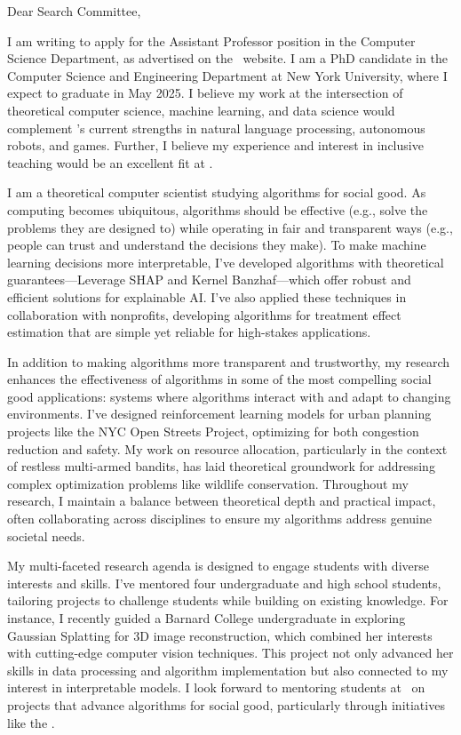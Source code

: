 \documentclass[11pt]{article}
\begin{document}
{\setlength{\parindent}{0cm}

Dear Search Committee,

I am writing to apply for the Assistant Professor position in the Computer Science Department, as advertised on the \school~website. I am a PhD candidate in the Computer Science and Engineering Department at New York University, where I expect to graduate in May 2025. I believe my work at the intersection of theoretical computer science, machine learning, and data science would complement \school’s current strengths in natural language processing, autonomous robots, and games. Further, I believe my experience and interest in inclusive teaching would be an excellent fit at \school.

I am a theoretical computer scientist studying algorithms for social good. As computing becomes ubiquitous, algorithms should be effective (e.g., solve the problems they are designed to) while operating in fair and transparent ways (e.g., people can trust and understand the decisions they make). To make machine learning decisions more interpretable, I’ve developed algorithms with theoretical guarantees—Leverage SHAP and Kernel Banzhaf—which offer robust and efficient solutions for explainable AI. I’ve also applied these techniques in collaboration with nonprofits, developing algorithms for treatment effect estimation that are simple yet reliable for high-stakes applications.

In addition to making algorithms more transparent and trustworthy, my research enhances the effectiveness of algorithms in some of the most compelling social good applications: systems where algorithms interact with and adapt to changing environments. I’ve designed reinforcement learning models for urban planning projects like the NYC Open Streets Project, optimizing for both congestion reduction and safety. My work on resource allocation, particularly in the context of restless multi-armed bandits, has laid theoretical groundwork for addressing complex optimization problems like wildlife conservation. Throughout my research, I maintain a balance between theoretical depth and practical impact, often collaborating across disciplines to ensure my algorithms address genuine societal needs.

My multi-faceted research agenda is designed to engage students with diverse interests and skills. I've mentored four undergraduate and high school students, tailoring projects to challenge students while building on existing knowledge. For instance, I recently guided a Barnard College undergraduate in exploring Gaussian Splatting for 3D image reconstruction, which combined her interests with cutting-edge computer vision techniques. This project not only advanced her skills in data processing and algorithm implementation but also connected to my interest in interpretable models. I look forward to mentoring students at \school~on projects that advance algorithms for social good, particularly through initiatives like the \program.

}
\end{document}
